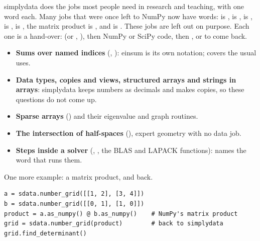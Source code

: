 simplydata does the jobs most people need in research and teaching, with one word each. Many jobs that
were once left to NumPy now have words:  is ,  is
,  is ,  is
,  is , the matrix product is
, and  is . These jobs are left out
on purpose. Each one is a hand-over:  (or ,
), then NumPy or SciPy code, then ,
 or  to come back.
\begin{itemize}
  \item \textbf{Sums over named indices} (, ): einsum is its own
    notation;  covers the usual uses.
  \item \textbf{Data types, copies and views, structured arrays and strings in arrays}: simplydata keeps
    numbers as decimals and makes copies, so these questions do not come up.
  \item \textbf{Sparse arrays} () and their eigenvalue and graph routines.
  \item \textbf{The intersection of half-spaces} (), expert
    geometry with no data job.
  \item \textbf{Steps inside a solver} (, , the BLAS and LAPACK
    functions):  names the word that runs them.
\end{itemize}

One more example: a matrix product, and back.

\begin{lstlisting}[style=py]
a = sdata.number_grid([[1, 2], [3, 4]])
b = sdata.number_grid([[0, 1], [1, 0]])
product = a.as_numpy() @ b.as_numpy()    # NumPy's matrix product
grid = sdata.number_grid(product)        # back to simplydata
grid.find_determinant()
\end{lstlisting}

